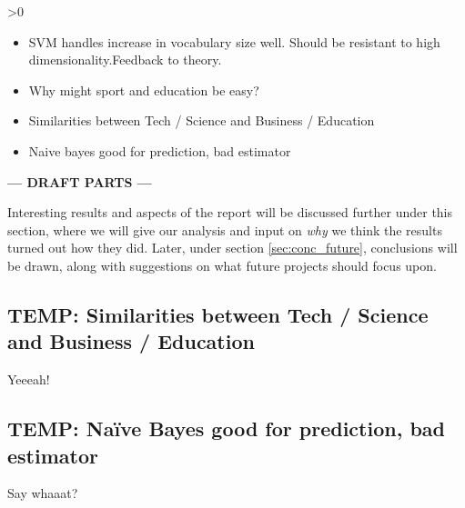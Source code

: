 \ifnum\printdraft>0
	\begin{itemize}
		\item SVM handles increase in vocabulary size well. Should be resistant to high dimensionality.Feedback to theory.
		\item Why might sport and education be easy?
		\item Similarities between Tech / Science and Business / Education
		\item Naive bayes good for prediction, bad estimator
	\end{itemize}
\else
\begin{center}
	\textbf{--- DRAFT PARTS ---}
\end{center}
\fi
Interesting results and aspects of the report will be discussed further under this section, where we will give our analysis and input on \emph{why} we think the results turned out how they did. Later, under section \ref{sec:conc_future}, conclusions will be drawn, along with suggestions on what future projects should focus upon.

\subsection{TEMP: Similarities between Tech / Science and Business / Education} %
\label{sub:temp_similarities_between_tech_science_and_business_education}
Yeeeah!

\subsection{TEMP: Naïve Bayes good for prediction, bad estimator} %
\label{sub:temp_na_ve_bayes_good_for_prediction_bad_estimator}
Say whaaat?

